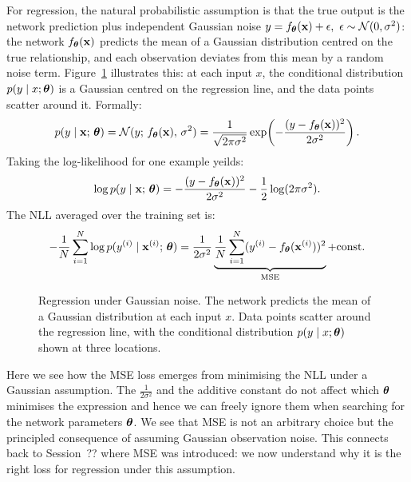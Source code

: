 For regression, the natural probabilistic assumption is that the true output is the network prediction plus independent Gaussian noise $y = f_{\boldsymbol{\theta}}(\mathbf{x}) + \epsilon, \ \epsilon \sim \mathcal{N}(0, \sigma^2)$: the network $f_{\boldsymbol{\theta}}(\mathbf{x})$ predicts the mean of a Gaussian distribution centred on the true relationship, and each observation deviates from this mean by a random noise term. Figure~\ref{fig:gaussian_regression} illustrates this: at each input $x$, the conditional distribution $p(y \mid x; \boldsymbol{\theta})$ is a Gaussian centred on the regression line, and the data points scatter around it. Formally:
\begin{equation}
    p(y \mid \mathbf{x};\, \boldsymbol{\theta}) = \mathcal{N}(y;\, f_{\boldsymbol{\theta}}(\mathbf{x}),\, \sigma^2) = \frac{1}{\sqrt{2\pi\sigma^2}} \exp\!\left(-\frac{(y - f_{\boldsymbol{\theta}}(\mathbf{x}))^2}{2\sigma^2}\right).
\end{equation}
Taking the log-likelihood for one example yeilds:
\begin{equation}
    \log p(y \mid \mathbf{x};\, \boldsymbol{\theta}) = -\frac{(y - f_{\boldsymbol{\theta}}(\mathbf{x}))^2}{2\sigma^2} - \frac{1}{2}\log(2\pi\sigma^2).
\end{equation}
The NLL averaged over the training set is:
\begin{equation}
    -\frac{1}{N}\sum_{i=1}^{N} \log p(y^{(i)} \mid \mathbf{x}^{(i)};\, \boldsymbol{\theta}) = \frac{1}{2\sigma^2} \underbrace{\frac{1}{N}\sum_{i=1}^{N}(y^{(i)} - f_{\boldsymbol{\theta}}(\mathbf{x}^{(i)}))^2}_{\text{MSE}} + \text{const}.
\end{equation}

\begin{figure}
\centering
{}
\resizebox{0.40\textwidth}{!}{}
\caption{Regression under Gaussian noise. The network predicts the mean of a Gaussian distribution at each input $x$. Data points scatter around the regression line, with the conditional distribution $p(y \mid x; \boldsymbol{\theta})$ shown at three locations.}
\label{fig:gaussian_regression}
\end{figure}
Here we see how the MSE loss emerges from minimising the NLL under a Gaussian assumption. The $\frac{1}{2\sigma^2}$ and the additive constant do not affect which $\boldsymbol{\theta}$ minimises the expression and hence we can freely ignore them when searching for the network parameters $\boldsymbol{\theta}$. We see that MSE is not an arbitrary choice but the principled consequence of assuming Gaussian observation noise. This connects back to Session~?? where MSE was introduced: we now understand why it is the right loss for regression under this assumption.


